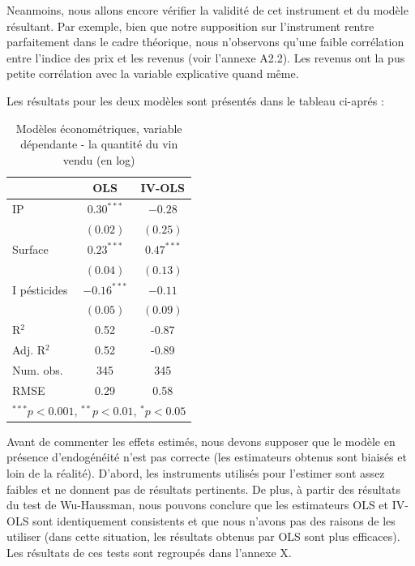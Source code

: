 \documentclass[11pt,]{article}
\begin{document}
Neanmoins, nous allons encore vérifier la validité de cet instrument et
du modèle résultant. Par exemple, bien que notre supposition sur
l'instrument rentre parfaitement dans le cadre théorique, nous
n'observons qu'une faible corrélation entre l'indice des prix et les
revenus (voir l'annexe A2.2). Les revenus ont la pus petite corrélation
avec la variable explicative quand même.

Les résultats pour les deux modèles sont présentés dans le tableau
ci-aprés :

\FloatBarrier

\begin{table}[!htbp]
\begin{center}
\begin{tabular}{l c c }
\hline
 & OLS & IV-OLS \\
\hline
IP           & $0.30^{***}$  & $-0.28$      \\
             & $(0.02)$      & $(0.25)$     \\
Surface      & $0.23^{***}$  & $0.47^{***}$ \\
             & $(0.04)$      & $(0.13)$     \\
I pésticides & $-0.16^{***}$ & $-0.11$      \\
             & $(0.05)$      & $(0.09)$     \\
\hline
R$^2$        & 0.52          & -0.87        \\
Adj. R$^2$   & 0.52          & -0.89        \\
Num. obs.    & 345           & 345          \\
RMSE         & 0.29          & 0.58         \\
\hline
\multicolumn{3}{l}{\scriptsize{$^{***}p<0.001$, $^{**}p<0.01$, $^*p<0.05$}}
\end{tabular}
\caption{Modèles économétriques, variable dépendante - la quantité du vin vendu (en log)}
\label{table : ols et ivols}
\end{center}
\end{table}

\FloatBarrier

Avant de commenter les effets estimés, nous devons supposer que le
modèle en présence d'endogénéité n'est pas correcte (les estimateurs
obtenus sont biaisés et loin de la réalité). D'abord, les instruments
utilisés pour l'estimer sont assez faibles et ne donnent pas de
résultats pertinents. De plus, à partir des résultats du test de
Wu-Haussman, nous pouvons conclure que les estimateurs OLS et IV-OLS
sont identiquement consistents et que nous n'avons pas des raisons de
les utiliser (dans cette situation, les résultats obtenus par OLS sont
plus efficaces). Les résultats de ces tests sont regroupés dans l'annexe
X.
\end{document}
